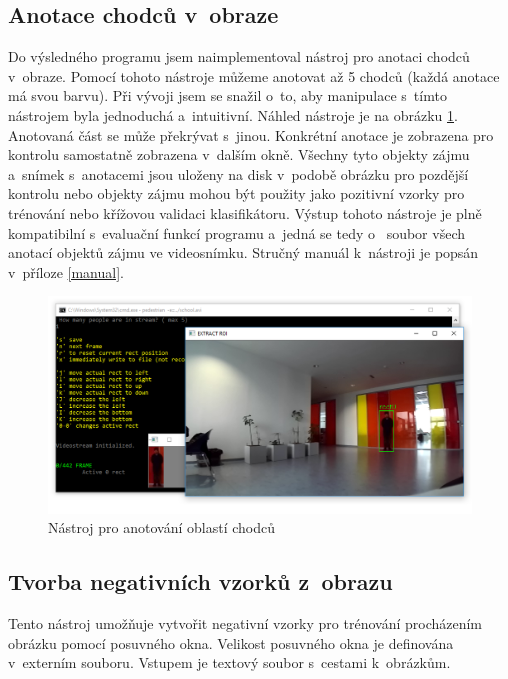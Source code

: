 \subsection{Anotace chodců v~obraze} Do výsledného programu jsem naimplementoval nástroj pro anotaci chodců v~obraze. Pomocí tohoto nástroje můžeme anotovat až 5 chodců (každá anotace má svou barvu).
Při vývoji jsem se snažil o~to, aby manipulace s~tímto nástrojem byla jednoduchá a~intuitivní. Náhled nástroje je na obrázku \ref{tool_anotate}.
Anotovaná část se může překrývat s~jinou. Konkrétní anotace je zobrazena pro kontrolu samostatně zobrazena v~dalším okně.
Všechny tyto objekty zájmu a~snímek s~anotacemi jsou uloženy na disk v~podobě obrázku pro pozdější kontrolu nebo objekty zájmu mohou být použity jako pozitivní vzorky pro trénování nebo křížovou validaci klasifikátoru. Výstup tohoto nástroje je plně kompatibilní s~evaluační funkcí programu a~jedná se tedy o~ soubor všech anotací objektů zájmu ve videosnímku. Stručný manuál k~nástroji je popsán v~příloze \ref{manual}.
 \begin{figure}[H]
\centering
\includegraphics[width=16cm]{figures/annotation_example}
\caption{Nástroj pro anotování oblastí chodců}
\label{tool_anotate}
\end{figure}

\subsection{Tvorba negativních vzorků z~obrazu}
Tento nástroj umožňuje vytvořit negativní vzorky pro trénování procházením obrázku pomocí posuvného okna. Velikost posuvného okna je definována v~externím souboru. Vstupem je textový soubor s~cestami k~obrázkům.



